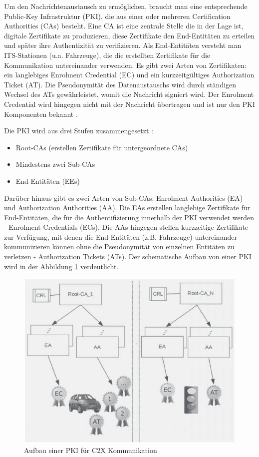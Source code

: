 Um den Nachrichtenaustausch zu ermöglichen, braucht man eine entsprechende Public-Key Infrastruktur (PKI), die aus einer oder mehreren Certification Authorities (CAs) besteht. Eine CA ist eine zentrale Stelle die in der Lage ist, digitale Zertifikate zu produzieren, diese Zertifikate den End-Entitäten zu erteilen und später ihre Authentizität zu verifizieren. Als End-Entitäten versteht man ITS-Stationen (u.a. Fahrzeuge), die die erstellten Zertifikate für die Kommunikation untereinander verwenden. Es gibt zwei Arten von Zertifikaten: ein langlebiges Enrolment Credential (EC) und ein kurzzeitgültiges Authorization Ticket (AT). Die Pseudonymität des Datenaustauschs wird durch ständigen Wechsel des ATs gewährleistet, womit die Nachricht signiert wird. Der Enrolment Credential wird hingegen nicht mit der Nachricht übertragen und ist nur den PKI Komponenten bekannt \cite{Strubbe2017}. 

Die PKI wird aus drei Stufen zusammengesetzt \cite{SecurityCITS}: 
\begin{itemize}
	\item Root-CAs (erstellen Zertifikate für untergeordnete CAs)
	\item Mindestens zwei Sub-CAs
	\item End-Entitäten (EEs)
\end{itemize}

Darüber hinaus gibt es zwei Arten von Sub-CAs: Enrolment Authorities (EA) und Authorization Authorities (AA). Die EAs erstellen langlebige Zertifikate für End-Entitäten, die für die Authentifizierung innerhalb der PKI verwendet werden - Enrolment Credentials (ECs). Die AAs hingegen stellen kurzzeitige Zertifikate zur Verfügung, mit denen die End-Entitäten (z.B. Fahrzeuge) untereinander kommunizieren können ohne die Pseudonymität von einzelnen Entitäten zu verletzen - Authorization Tickets (ATs). Der schematische Aufbau von einer PKI wird in der Abbildung \ref{fig:pki} verdeutlicht.

\begin{figure}
	\centering
	\includegraphics[width=0.7\linewidth]{images/PKI}
	\caption[Aufbau einer PKI für C2X Kommunikation]{Aufbau einer PKI für C2X Kommunikation \footnotemark}
	\label{fig:pki}
\end{figure}

